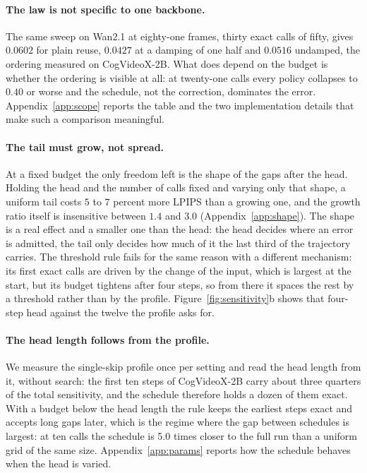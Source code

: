 \paragraph{The law is not specific to one backbone.} The same sweep on Wan2.1 at eighty-one
frames, thirty exact calls of fifty, gives $0.0602$ for plain reuse, $0.0427$ at a damping of one
half and $0.0516$ undamped, the ordering measured on CogVideoX-2B. What does depend on the budget is
whether the ordering is visible at all: at twenty-one calls every policy collapses to $0.40$ or
worse and the schedule, not the correction, dominates the error. Appendix~\ref{app:scope} reports
the table and the two implementation details that make such a comparison meaningful.

\paragraph{The tail must grow, not spread.} At a fixed budget the only freedom left is the shape of the gaps after the head. Holding the head and the number of calls fixed and varying only that shape, a uniform tail costs $5$ to $7$ percent more LPIPS than a growing one, and the growth ratio itself is insensitive between $1.4$ and $3.0$ (Appendix~\ref{app:shape}). The shape is a real effect and a smaller one than the head: the head decides where an error is admitted, the tail only decides how much of it the last third of the trajectory carries. The threshold rule fails for the same reason with a different mechanism: its first exact calls are driven by the change of the input, which is largest at the start, but its budget tightens after four steps, so from there it spaces the rest by a threshold rather than by the profile. Figure~\ref{fig:sensitivity}b shows that four-step head against the twelve the profile asks for.

\paragraph{The head length follows from the profile.} We measure the single-skip profile once per setting and read the head length from it, without search: the first ten steps of CogVideoX-2B carry about three quarters of the total sensitivity, and the schedule therefore holds a dozen of them exact. With a budget below the head length the rule keeps the earliest steps exact and accepts long gaps later, which is the regime where the gap between schedules is largest: at ten calls the schedule is 5.0 times closer to the full run than a uniform grid of the same size. Appendix~\ref{app:params} reports how the schedule behaves when the head is varied.

